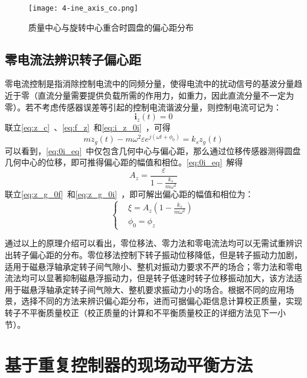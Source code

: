 \documentclass[
  lang=cn,
  degree=master,
  openany,oneside
]{nuaathesis}
\begin{document}
\begin{figure}[h!]
	\texttt{[image: 4-ine\_axis\_co.png]}
	\caption{质量中心与旋转中心重合时圆盘的偏心距分布}
	\label{fig:4-ine_axis_co}
\end{figure}


\subsection{零电流法辨识转子偏心距}

零电流控制是指消除控制电流中的同频分量，使得电流中的扰动信号的基波分量趋近于零（直流分量需要提供负载所需的作用力，如重力，因此直流分量不一定为零）。若不考虑传感器误差等引起的控制电流谐波分量，则控制电流可记为：
\begin{equation}
	\label{eq:i_z_0i}
	\boldsymbol{i}_z(t) = 0
\end{equation}
联立\autoref{eq:z_c}~、\autoref{eq:f_z}~和\autoref{eq:i_z_0i}~，可得
\begin{equation}
	\label{eq:0i_eq}
	m{\ddot{z}}_g(t) - m{\omega}^2\varepsilon e^{j (\omega t + \phi _0)} = k_sz_g(t) 
\end{equation}
可以看到，\autoref{eq:0i_eq}~中仅包含几何中心与偏心距，那么通过位移传感器测得圆盘几何中心的位移，即可推得偏心距的幅值和相位。\autoref{eq:0i_eq}~解得
\begin{equation}
	\label{eq:z_g_0i}
	A_z = \frac{\varepsilon}{1-\frac{k_s}{m{\omega}^2}}
\end{equation}
联立\autoref{eq:z_g_0f}~和\autoref{eq:z_g_0i}~，即可解出偏心距的幅值和相位为：
\begin{equation}
\label{eq:z_delta_0i}
\left\{
\begin{aligned}
& \xi = A_z\left( 1 -\frac{k_s}{m{\omega}^2} \right) \\
& \phi _0 = \phi _z
\end{aligned}
\right.
\end{equation}

通过以上的原理介绍可以看出，零位移法、零力法和零电流法均可以无需试重辨识出转子偏心距的分布。零位移法控制下转子振动位移降低，但是转子振动力加剧，适用于磁悬浮轴承定转子间气隙小、整机对振动力要求不严的场合；零力法和零电流法均可以显著抑制磁悬浮振动力，但是转子低速时转子位移振动加大，该方法适用于磁悬浮轴承定转子间气隙大、整机要求振动力小的场合。根据不同的应用场景，选择不同的方法来辨识偏心距分布，进而可据偏心距信息计算校正质量，实现转子不平衡质量校正（校正质量的计算和不平衡质量校正的详细方法见下一小节）。

\section{基于重复控制器的现场动平衡方法}
\end{document}

